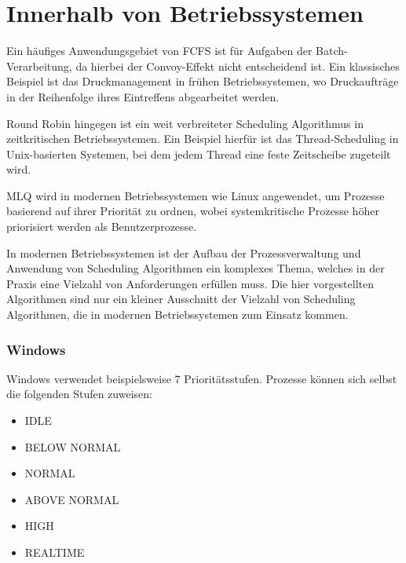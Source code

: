 
\section{Innerhalb von Betriebssystemen}
Ein häufiges Anwendungsgebiet von \ac{FCFS} ist für Aufgaben der Batch-Verarbeitung, da hierbei der Convoy-Effekt nicht entscheidend ist. Ein klassisches Beispiel ist das Druckmanagement in frühen Betriebssystemen, wo Druckaufträge in der Reihenfolge ihres Eintreffens abgearbeitet werden.  %

Round Robin hingegen ist ein weit verbreiteter Scheduling Algorithmus in zeitkritischen Betriebssystemen. Ein Beispiel hierfür ist das Thread-Scheduling in Unix-basierten Systemen, bei dem jedem Thread eine feste Zeitscheibe zugeteilt wird. %

\ac{MLQ} wird in modernen Betriebssystemen wie Linux angewendet, um Prozesse basierend auf ihrer Priorität zu ordnen, wobei systemkritische Prozesse höher priorisiert werden als Benutzerprozesse. %

In modernen Betriebssystemen ist der Aufbau der Prozessverwaltung und Anwendung von Scheduling Algorithmen ein komplexes Thema, welches in der Praxis eine Vielzahl von Anforderungen erfüllen muss. Die hier vorgestellten Algorithmen sind nur ein kleiner Ausschnitt der Vielzahl von Scheduling Algorithmen, die in modernen Betriebssystemen zum Einsatz kommen.

\subsubsection{Windows}
Windows verwendet beispielsweise 7 Prioritätsstufen.
Prozesse können sich selbst die folgenden Stufen zuweisen:
\begin{multicols}{3}
    \begin{itemize}[noitemsep]
        \item IDLE
        \item BELOW NORMAL
        \item NORMAL
        \item ABOVE NORMAL
        \item HIGH
        \item REALTIME
    \end{itemize}
\end{multicols}

